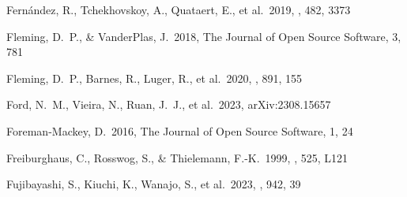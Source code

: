 \documentclass[twocolumn,twocolappendix]{aastex63}
\begin{document}
{\begin{thebibliography}{}


 Fern{\'a}ndez, R., Tchekhovskoy, A., Quataert, E., et al.\ 2019, \mnras, 482, 3373


 Fleming, D.~P., \& VanderPlas, J.\ 2018, The Journal of Open Source Software, 3, 781


 Fleming, D.~P., Barnes, R., Luger, R., et al.\ 2020, \apj, 891, 155




 Ford, N.~M., Vieira, N., Ruan, J.~J., et al.\ 2023, arXiv:2308.15657




 Foreman-Mackey, D.\ 2016, The Journal of Open Source Software, 1, 24







 
 Freiburghaus, C., Rosswog, S., \& Thielemann, F.-K.\ 1999, \apjl, 525, L121




 Fujibayashi, S., Kiuchi, K., Wanajo, S., et al.\ 2023, \apj, 942, 39





\end{thebibliography}}
\end{document}
